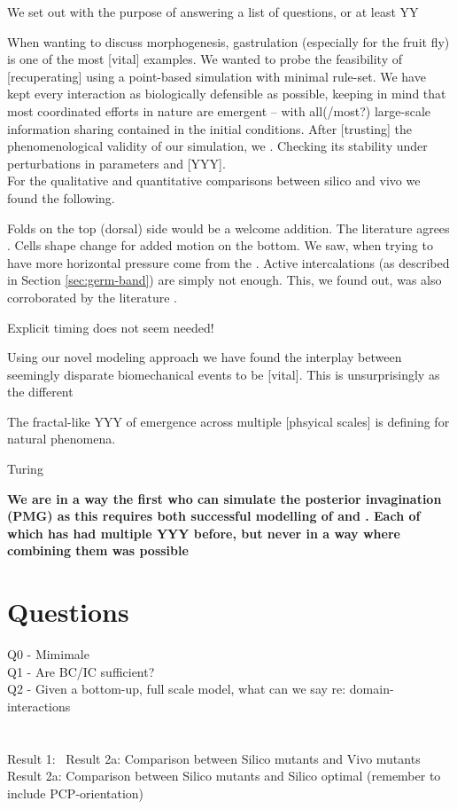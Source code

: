 We set out with the purpose of answering a list of questions, or at least YY

When wanting to discuss morphogenesis, gastrulation (especially for the fruit fly) is one of the most [vital] examples. We wanted to probe the feasibility of [recuperating] using a point-based simulation with minimal rule-set. We have kept every interaction as biologically defensible as possible, keeping in mind that most coordinated efforts in nature are emergent -- with all(/most?) large-scale information sharing contained in the initial conditions.
After [trusting] the phenomenological validity of our simulation, we . Checking its stability under perturbations in parameters and [YYY].\\

For the qualitative and quantitative comparisons between silico and vivo we found the following.

Folds on the top (dorsal) side would be a welcome addition. The literature agrees \reph{}. Cells shape change for added motion on the bottom. We saw, when trying to have more horizontal pressure come from the . Active intercalations (as described in Section \ref{sec:germ-band}) are simply not enough. This, we found out, was also corroborated by the literature \cite{detder}.

Explicit timing does not seem needed!

Using our novel modeling approach we have found the interplay between seemingly disparate biomechanical events to be [vital]. This is   unsurprisingly as the different   

The fractal-like YYY of emergence across multiple [phsyical scales] is defining for natural phenomena.

Turing


\textbf{We are in a way the first who can simulate the posterior invagination (PMG)  as this requires both successful modelling of  and . Each of which has had multiple YYY before, but never in a way where combining them was possible}


\section{Questions}
Q0 - Mimimale\\
Q1 - Are BC/IC sufficient?\\
Q2 - Given a bottom-up, full scale model, what can we say re: domain-interactions\\
\\\\
Result 1: \
Result 2a: Comparison between Silico mutants and Vivo mutants\\
Result 2a: Comparison between Silico mutants and Silico optimal (remember to include PCP-orientation)\\

